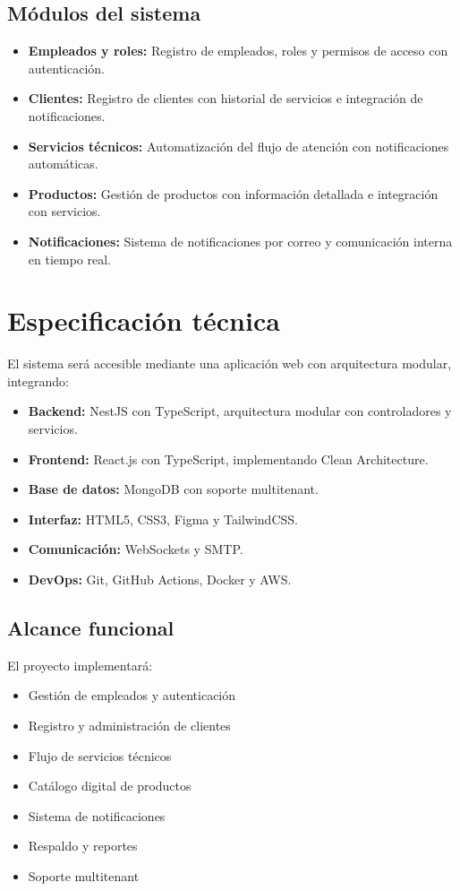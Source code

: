 \subsection*{Módulos del sistema}

\begin{itemize}
    \item \textbf{Empleados y roles:} Registro de empleados, roles y permisos de acceso con autenticación.
    \item \textbf{Clientes:} Registro de clientes con historial de servicios e integración de notificaciones.
    \item \textbf{Servicios técnicos:} Automatización del flujo de atención con notificaciones automáticas.
    \item \textbf{Productos:} Gestión de productos con información detallada e integración con servicios.
    \item \textbf{Notificaciones:} Sistema de notificaciones por correo y comunicación interna en tiempo real.
\end{itemize}

\section{Especificación técnica}

El sistema será accesible mediante una aplicación web con arquitectura modular, integrando:

\begin{itemize}
	\item \textbf{Backend:} NestJS con TypeScript, arquitectura modular con controladores y servicios.
	\item \textbf{Frontend:} React.js con TypeScript, implementando Clean Architecture.
	\item \textbf{Base de datos:} MongoDB con soporte multitenant.
	\item \textbf{Interfaz:} HTML5, CSS3, Figma y TailwindCSS.
	\item \textbf{Comunicación:} WebSockets y SMTP.
	\item \textbf{DevOps:} Git, GitHub Actions, Docker y AWS.
\end{itemize}

\subsection*{Alcance funcional}

El proyecto implementará:
\begin{itemize}
	\item Gestión de empleados y autenticación
	\item Registro y administración de clientes
	\item Flujo de servicios técnicos
	\item Catálogo digital de productos
	\item Sistema de notificaciones
	\item Respaldo y reportes
	\item Soporte multitenant
\end{itemize}

